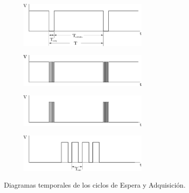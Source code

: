 \documentclass[11pt,a4paper,oneside]{article}
\begin{document}
\begin{figure}[H]
  \begin{subfigure}[b]{\textwidth}
    \centering
    \includegraphics[width=0.7\textwidth]{images/ciclo_tiempo_control}
    \label{fig:ciclo-control}
  \end{subfigure}
  \hfill
  \begin{subfigure}[b]{\textwidth}
    \centering
    \includegraphics[width=0.7\textwidth]{images/ciclo_tiempo_linea}
    \label{fig:ciclo-linea}
  \end{subfigure}  
  \hfill
  \begin{subfigure}[b]{\textwidth}
    \centering
    \includegraphics[width=0.7\textwidth]{images/ciclo_tiempo_salida}    
    \label{fig:ciclo-salida}
  \end{subfigure}  
  \begin{subfigure}[b]{\textwidth}
    \centering
    \includegraphics[width=0.7\textwidth]{images/ciclo_tiempo_salida_zoom}    
    \label{fig:ciclo-salida-zoom}
  \end{subfigure}  
  \caption{Diagramas temporales de los ciclos de Espera y Adquisición.}
  \label{fig:ciclo-tiempo}
\end{figure}
\end{document}
